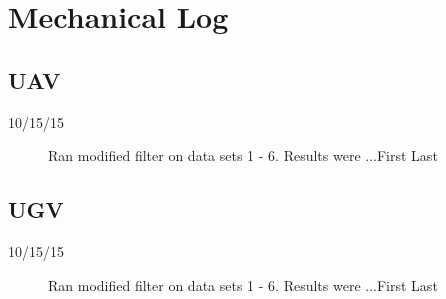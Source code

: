 \section{Mechanical Log}


\subsection{UAV}


\begin{description}
\item [10/15/15]  Ran modified filter on data sets 1 - 6.  Results were ...\hfill{First Last}


\end{description}


\subsection{UGV}


\begin{description}
\item [10/15/15]  Ran modified filter on data sets 1 - 6.  Results were ...\hfill{First Last}


\end{description}